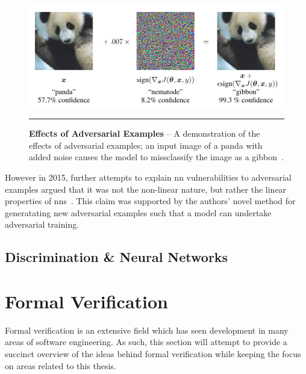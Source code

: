 \begin{figure}[H]
\includegraphics[width=1\textwidth]{media/literature/adversarial-example.png}
    \rule{35em}{0.5pt}
    \caption[Demonstration of the effects of adversarial examples]{\textbf{Effects of Adversarial Examples} -- A demonstration of the effects of adversarial examples; an input image of a panda with added noise causes the model to missclassify the image as a gibbon~\citep{goodfellow2015}.}\label{fig:adversarial-example}
\end{figure}

However in 2015, further attempts to explain \gls{nn} vulnerabilities to adversarial examples argued
that it was not the non-linear nature, but rather the linear properties of \glspl{nn}~\citep{goodfellow2015}.
This claim was supported by the authors' novel method for generatating new adversarial examples such that a model 
can undertake adversarial training.



\subsection{Discrimination \& Neural Networks}



%


\section{Formal Verification}

Formal verification is an extensive field which has seen development in many areas 
of software engineering. As such, this section will attempt to provide a succinct 
overview of the ideas behind formal verification while keeping the focus on areas
related to this thesis.

